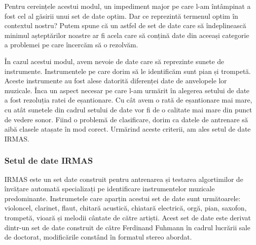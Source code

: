 \documentclass[a4paper,12pt]{report}
\begin{document}
   Pentru cereințele acestui modul, un impediment major pe care l-am întâmpinat a fost cel al găsirii unui set de date optim. Dar ce reprezintă termenul optim în contextul nostru? Putem spune că un astfel de set de date care să îndeplinească minimul așteptărilor noastre ar fi acela care să conțină date din aceeași categorie a problemei pe care încercăm să o rezolvăm. 
   
   În cazul acestui modul, avem nevoie de date care să reprezinte sunete de instrumente. Instrumentele pe care dorim să le identificăm sunt pian și trompetă. Aceste instrumente au fost alese datorită diferenței date de anvelopele lor muzicale. Înca un aspect necesar pe care l-am urmărit în alegerea setului de date a fost rezoluția ratei de eșantionare. Cu cât avem o rată de eșantionare mai mare, cu atât sunetele din cadrul setului de date vor fi de o calitate mai mare din punct de vedere sonor. Fiind o problemă de clasificare, dorim ca datele de antrenare să aibă clasele atașate în mod corect. Urmărind aceste criterii, am ales setul de date IRMAS.
   
   
   \subsubsection{Setul de date IRMAS} 
   IRMAS \cite{irmas} este un set date construit pentru antrenarea și testarea algortimilor de învățare automată specializați pe identificare instrumentelor muzicale predominante. Instrumetele care aparțin acestui set de date sunt următoarele: violoncel, clarinet, flaut, chitară acustică, chiatară electrică, orgă, pian, saxofon, trompetă, vioară și melodii cântate de către artiști. Acest set de date este derivat dintr-un set de date construit de către Ferdinand Fuhmann în cadrul lucrării sale de doctorat, modificările constând în formatul stereo abordat.
   
\end{document}
